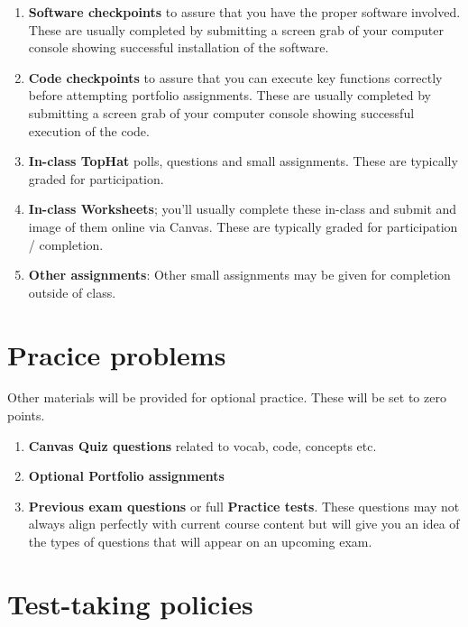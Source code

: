 \documentclass[
]{book}
\providecommand{\tightlist}{%
  \setlength{\itemsep}{0pt}\setlength{\parskip}{0pt}}
\begin{document}
\begin{enumerate}
\def\labelenumi{\arabic{enumi}.}
\tightlist
\item
  \textbf{Software checkpoints} to assure that you have the proper software involved. These are usually completed by submitting a screen grab of your computer console showing successful installation of the software.
\item
  \textbf{Code checkpoints} to assure that you can execute key functions correctly before attempting portfolio assignments. These are usually completed by submitting a screen grab of your computer console showing successful execution of the code.
\item
  \textbf{In-class TopHat} polls, questions and small assignments. These are typically graded for participation.
\item
  \textbf{In-class Worksheets}; you'll usually complete these in-class and submit and image of them online via Canvas. These are typically graded for participation / completion.
\item
  \textbf{Other assignments}: Other small assignments may be given for completion outside of class.
\end{enumerate}

\hypertarget{pracice-problems}{%
\section{Pracice problems}\label{pracice-problems}}

Other materials will be provided for optional practice. These will be set to zero points.

\begin{enumerate}
\def\labelenumi{\arabic{enumi}.}
\tightlist
\item
  \textbf{Canvas Quiz questions} related to vocab, code, concepts etc.
\item
  \textbf{Optional Portfolio assignments}
\item
  \textbf{Previous exam questions} or full \textbf{Practice tests}. These questions may not always align perfectly with current course content but will give you an idea of the types of questions that will appear on an upcoming exam.
\end{enumerate}

\hypertarget{test-taking-policies}{%
\section{Test-taking policies}\label{test-taking-policies}}
\end{document}
